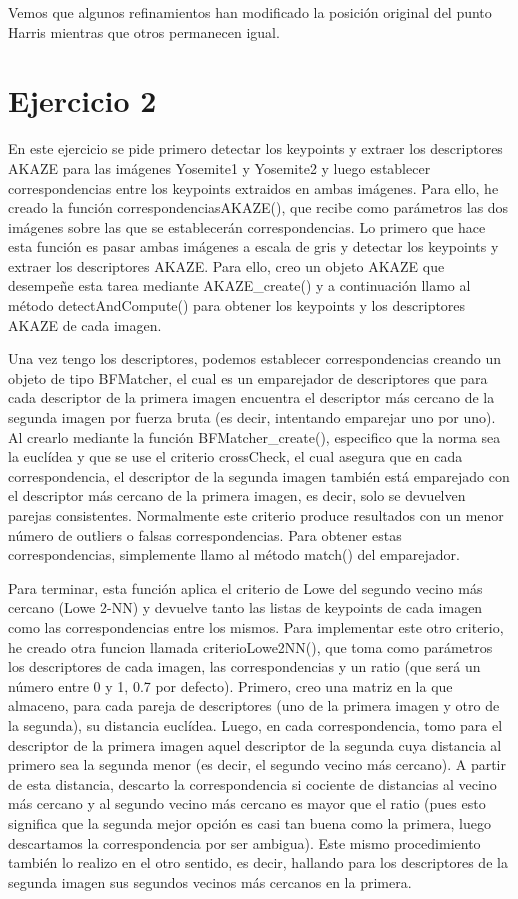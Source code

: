 \documentclass[10pt,a4paper]{article}
\begin{document}
Vemos que algunos refinamientos han modificado la posición original del punto Harris mientras que otros permanecen igual.



\newpage
\section{Ejercicio 2}

En este ejercicio se pide primero detectar los keypoints y extraer los descriptores AKAZE para las imágenes Yosemite1 y Yosemite2 y luego establecer correspondencias entre los keypoints extraidos en ambas imágenes. Para ello, he creado la función correspondenciasAKAZE(), que recibe como parámetros las dos imágenes sobre las que se establecerán correspondencias. Lo primero que hace esta función es pasar ambas imágenes a escala de gris y detectar los keypoints y extraer los descriptores AKAZE. Para ello, creo un objeto AKAZE que desempeñe esta tarea mediante AKAZE\_create() y a continuación llamo al método detectAndCompute() para obtener los keypoints y los descriptores AKAZE de cada imagen.

Una vez tengo los descriptores, podemos establecer correspondencias creando un objeto de tipo BFMatcher, el cual es un emparejador de descriptores que para cada descriptor de la primera imagen encuentra el descriptor más cercano de la segunda imagen por fuerza bruta (es decir, intentando emparejar uno por uno). Al crearlo mediante la función BFMatcher\_create(), especifico que la norma sea la euclídea y que se use el criterio crossCheck, el cual asegura que en cada correspondencia, el descriptor de la segunda imagen también está emparejado con el descriptor más cercano de la primera imagen, es decir, solo se devuelven parejas consistentes. Normalmente este criterio produce resultados con un menor número de outliers o falsas correspondencias. Para obtener estas correspondencias, simplemente llamo al método match() del emparejador.

Para terminar, esta función aplica el criterio de Lowe del segundo vecino más cercano (Lowe 2-NN) y devuelve tanto las listas de keypoints de cada imagen como las correspondencias entre los mismos. Para implementar este otro criterio, he creado otra funcion llamada criterioLowe2NN(), que toma como parámetros los descriptores de cada imagen, las correspondencias y un ratio (que será un número entre 0 y 1, 0.7 por defecto). Primero, creo una matriz en la que almaceno, para cada pareja de descriptores (uno de la primera imagen y otro de la segunda), su distancia euclídea. Luego, en cada correspondencia, tomo para el descriptor de la primera imagen aquel descriptor de la segunda cuya distancia al primero sea la segunda menor (es decir, el segundo vecino más cercano). A partir de esta distancia, descarto la correspondencia si cociente de distancias al vecino más cercano y al segundo vecino más cercano es mayor que el ratio (pues esto significa que la segunda mejor opción es casi tan buena como la primera, luego descartamos la correspondencia por ser ambigua). Este mismo procedimiento también lo realizo en el otro sentido, es decir, hallando para los descriptores de la segunda imagen sus segundos vecinos más cercanos en la primera.
\end{document}
